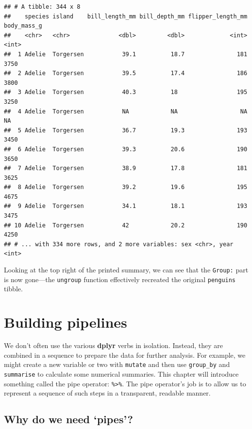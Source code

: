 \documentclass[
]{book}
\begin{document}
\begin{verbatim}
## # A tibble: 344 x 8
##    species island    bill_length_mm bill_depth_mm flipper_length_mm body_mass_g
##    <chr>   <chr>              <dbl>         <dbl>             <int>       <int>
##  1 Adelie  Torgersen           39.1          18.7               181        3750
##  2 Adelie  Torgersen           39.5          17.4               186        3800
##  3 Adelie  Torgersen           40.3          18                 195        3250
##  4 Adelie  Torgersen           NA            NA                  NA          NA
##  5 Adelie  Torgersen           36.7          19.3               193        3450
##  6 Adelie  Torgersen           39.3          20.6               190        3650
##  7 Adelie  Torgersen           38.9          17.8               181        3625
##  8 Adelie  Torgersen           39.2          19.6               195        4675
##  9 Adelie  Torgersen           34.1          18.1               193        3475
## 10 Adelie  Torgersen           42            20.2               190        4250
## # ... with 334 more rows, and 2 more variables: sex <chr>, year <int>
\end{verbatim}

Looking at the top right of the printed summary, we can see that the \texttt{Group:} part is now gone---the \texttt{ungroup} function effectively recreated the original \texttt{penguins} tibble.

\hypertarget{building-pipelines}{%
\chapter{Building pipelines}\label{building-pipelines}}

We don't often use the various \textbf{dplyr} verbs in isolation. Instead, they are combined in a sequence to prepare the data for further analysis. For example, we might create a new variable or two with \texttt{mutate} and then use \texttt{group\_by} and \texttt{summarise} to calculate some numerical summaries. This chapter will introduce something called the pipe operator: \texttt{\%\textgreater{}\%}. The pipe operator's job is to allow us to represent a sequence of such steps in a transparent, readable manner.

\hypertarget{why-do-we-need-pipes}{%
\section{Why do we need `pipes'?}\label{why-do-we-need-pipes}}
\end{document}
